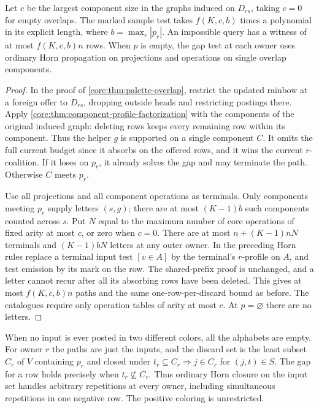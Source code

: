 \begin{corollary}
\label{core:cor:connected-palette-overlaps}
Let $c$ be the largest component size in the graphs induced on
$D_{rs}$, taking $c=0$ for empty overlaps. The marked sample test
takes $f(K,c,b)$ times a polynomial in its explicit length, where
$b=\max_r|p_r|$. An impossible query has a witness of at most
$f(K,c,b)n$ rows. When $p$ is empty, the gap test at each owner uses
ordinary Horn propagation on projections and operations on single
overlap components.
\end{corollary}
\begin{proof}
In the proof of \cref{core:thm:palette-overlap}, restrict the updated
rainbow at a foreign offer to $D_{rs}$, dropping outside heads and
restricting postings there. Apply
\cref{core:thm:component-profile-factorization} with the components
of the original induced graph: deleting rows keeps every remaining
row within its component. Thus the helper $g$ is supported on a single
component $C$. It omits the full current budget since it absorbs on
the offered rows, and it wins the current $r$-coalition. If it loses
on $p_r$, it already solves the gap and may terminate the path.
Otherwise $C$ meets $p_r$.

Use all projections and all component operations as terminals.
Only components meeting $p_r$ supply letters $(s,g)$; there are at
most $(K-1)b$ such components counted across $s$. Put $N$ equal to
the maximum number of core operations of fixed arity at most $c$,
or zero when $c=0$. There are at most $n+(K-1)nN$ terminals and
$(K-1)bN$ letters at any outer owner. In the preceding Horn rules
replace a terminal input test $[v\in A]$ by the terminal's
$r$-profile on $A$, and test emission by its mark on the row.
The shared-prefix proof is unchanged, and a letter cannot recur
after all its absorbing rows have been deleted. This gives at most
$f(K,c,b)n$ paths and the same one-row-per-discard bound as before.
The catalogues require only operation tables of arity at most $c$.
At $p=\varnothing$ there are no letters.
\end{proof}

When no input is ever posted in two different colors, all the
alphabets are empty. For owner $r$ the paths are just the inputs,
and the discard set is the least subset $C_r$ of $V$ containing
$p_r$ and closed under $t_r\subseteq C_r\Rightarrow j\in C_r$
for $(j,t)\in S$. The gap for a row holds precisely when
$t_r\not\subseteq C_r$. Thus ordinary Horn closure on the input set
handles arbitrary repetitions at every owner, including simultaneous
repetitions in one negative row. The positive coloring is unrestricted.

